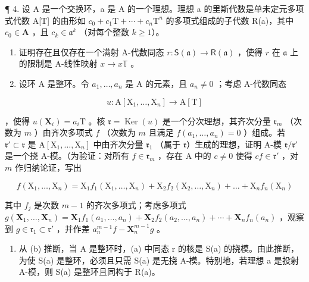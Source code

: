¶ 4. 设 A 是一个交换环，a 是 A 的一个理想。理想 a 的里斯代数是单未定元多项式代数 A{[}T{]} 的由形如 \(c_{0} + c_{1}\mathrm{T} + \cdots + c_{n}\mathrm{T}^{n}\) 的多项式组成的子代数 R(a)，其中 \(c_{0} \in \mathbf{A}\) ，且 \(c_{k} \in \mathfrak{a}^{k}\) （对每个整数 \(k \geqslant 1\)）。

\begin{enumerate}
\def\labelenumi{(\alph{enumi})}
\item
  证明存在且仅存在一个满射 A-代数同态 \(r: \mathsf{S}(\mathfrak{a}) \to \mathsf{R}(\mathfrak{a})\) ，使得 \(r\) 在 \(\mathfrak{a}\) 上的限制是 A-线性映射 \(x \to x\mathbb{T}\) 。
\item
  设环 A 是整环。令 \(a_1, \ldots, a_n\) 是 A 的元素，且 \(a_n \neq 0\) ；考虑 A-代数同态
\end{enumerate}

\[
u: \mathrm{A} [ \mathrm{X} _ {1}, \dots , \mathrm{X} _ {n} ] \rightarrow \mathrm{A} [ \mathrm{T} ]
\]

，使得 \(u(\mathbf{X}_i) = a_i\mathrm{T}\) 。核 \(\mathfrak{r} = \operatorname{Ker}(u)\) 是一个分次理想，其齐次分量 \(\mathfrak{r}_m\) （次数为 \(m\) ）由齐次多项式 \(f\) （次数为 \(m\) 且满足 \(f(a_1, \ldots, a_n) = 0\) ）组成。若 \(\mathfrak{r}' \subset \mathfrak{r}\) 是 \(\mathrm{A}[\mathrm{X}_1, \ldots, \mathrm{X}_n]\) 中由齐次分量 \(\mathfrak{r}_1\) （属于 \(\mathfrak{r}\)）生成的理想，证明 A-模 \(\mathfrak{r}/\mathfrak{r}'\) 是一个挠 A-模。（为验证：对所有 \(f \in \mathfrak{r}_m\) ，存在 A 中的 \(c \neq 0\) 使得 \(cf \in \mathfrak{r}'\) ，对 \(m\) 作归纳论证，写出

\[
f \left(\mathrm{X} _ {1}, \dots , \mathrm{X} _ {n}\right) = \mathrm{X} _ {1} f _ {1} \left(\mathrm{X} _ {1}, \dots , \mathrm{X} _ {n}\right) + \mathrm{X} _ {2} f _ {2} \left(\mathrm{X} _ {2}, \dots , \mathrm{X} _ {n}\right) + \dots + \mathrm{X} _ {n} f _ {n} \left(\mathrm{X} _ {n}\right)
\]

其中 \(f_{j}\) 是次数 \(m - 1\) 的齐次多项式；考虑多项式 \(g(\mathbf{X}_1, \ldots, \mathbf{X}_n) = \mathbf{X}_1 f_1(a_1, \ldots, a_n) + \mathbf{X}_2 f_2(a_2, \ldots, a_n) + \cdots + \mathbf{X}_n f_n(a_n)\) ，观察到 \(g \in \mathfrak{r}_1 \subset \mathfrak{r}'\) ，并作差 \(a_n^{m-1} f - \mathbf{X}_n^{m-1} g\) 。

\begin{enumerate}
\def\labelenumi{(\alph{enumi})}
\setcounter{enumi}{2}
\tightlist
\item
  从 (b) 推断，当 A 是整环时，(a) 中同态 r 的核是 S(a) 的挠模。由此推断，为使 S(a) 是整环，必须且只需 S(a) 是无挠 A-模。特别地，若理想 a 是投射 A-模，则 S(a) 是整环且同构于 R(a)。
\end{enumerate}


